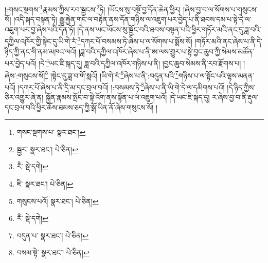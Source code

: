 །:གསང་སྔགས་\footnote{གསང་སྔགས་པ་  སྣར་ཐང་། }རྣམས་ཀྱིས་རབ་སྦྱངས་\footnote{སྦྱར་  སྣར་ཐང་།  པེ་ཅིན། }ཏེ། །ཡོངས་སུ་བསྔོ་བྱ་དོན་ཆེན་ཕྱིར། །ཞེས་བྱ་བ་ལ་སོགས་པ་གསུངས་སོ། །འདི་སྐད་བསྟན་ཏེ། རྒྱུ་རྐྱེན་གང་ལ་བརྟེན་ནས་དོན་གཉིས་ལ་འཇུག་པར་བྱེད་པ་ནི་ཐབས་དམ་པ་སྟེ་དེ་ལ་འཇུག་པར་བྱ་ཞེས་པའི་དོན་ཏོ། །དེ་ནས་ཡང་ཡོངས་སུ་སྦྱོང་བའི་ཐབས་བསྟན་པའི་ཕྱིར་གཏོར་མའི་ནང་དུ་ཟླ་བའི་དཀྱིལ་འཁོར་གྱི་སྟེང་དུ་ཡི་གེ་རཾ་\footnote{རྃ་  སྡེ་དགེ། }དཀར་པོ་བསམས་ཏེ་ཞེས་པ་ལ་སོགས་པ་སྨོས་སོ། །གཏོར་མའི་ནང་ཞེས་པ་ནི་དེ་ཉིད་ཀྱི་ནང་གི་ནམ་མཁའ་ལའོ། །ཟླ་བའི་དཀྱིལ་འཁོར་ཞེས་པ་ནི་ཨ་ལས་གྱུར་པ་སྟེ་བྱང་ཆུབ་ཀྱི་སེམས་མཚོན་པར་བྱེད་པའོ། །དེ་\footnote{ཇི་  སྣར་ཐང་།  པེ་ཅིན། }ཡང་ཇི་སྐད་དུ། ཟླ་བའི་དཀྱིལ་འཁོར་གཉིས་པ་ནི། །བྱང་ཆུབ་སེམས་ནི་རབ་རྫོགས་པ། །ཞེས་:གསུངས་སོ།\footnote{གསུངས་པའོ།  སྣར་ཐང་།  པེ་ཅིན། } །སྟེང་དུ་ཟླ་བ་གོ་སླའོ། །ཡི་གེ་རཾ་\footnote{རྃ་  སྡེ་དགེ། }ཞེས་པ་ནི་:བདུན་པའི་\footnote{བདུན་པ་  སྣར་ཐང་།  པེ་ཅིན། }གཉིས་པ་ལ་སྟོང་པའི་ལྷས་མནན་པའོ། །དཀར་པོ་ཞེས་པ་ནི་དྲི་མ་དང་བྲལ་བའོ། །:བསམས་ཏེ་\footnote{བསམ་སྟེ་  སྣར་ཐང་།  པེ་ཅིན། }ཞེས་པ་ནི་ཡི་གེ་དེ་ལ་དམིགས་པའོ། །དེ་ཉིད་ཀྱིས་ཅིར་འགྱུར་ཞེ་ན། སྐྱོན་རྣམས་སྤོང་བ་སྟེ་འོག་ནས་སྟོན་པ་ལ་འཇུག་པའོ། །དེ་ཡང་ཇི་སྐད་དུ། ར་ཞེས་བྱ་བ་ནི་རྡུལ་དང་བྲལ་བའི་ཕྱིར་ཆོས་ཐམས་ཅད་ཀྱི་སྒོ་ཡིན་ནོ་ཞེས་གསུངས་སོ། །
